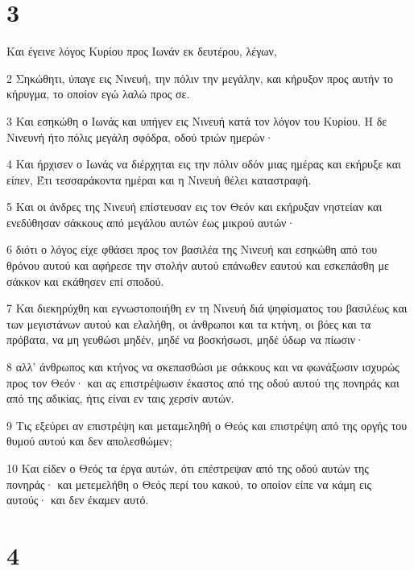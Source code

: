 \chapter{3}

\par Και έγεινε λόγος Κυρίου προς Ιωνάν εκ δευτέρου, λέγων,
\par 2 Σηκώθητι, ύπαγε εις Νινευή, την πόλιν την μεγάλην, και κήρυξον προς αυτήν το κήρυγμα, το οποίον εγώ λαλώ προς σε.
\par 3 Και εσηκώθη ο Ιωνάς και υπήγεν εις Νινευή κατά τον λόγον του Κυρίου. Η δε Νινευνή ήτο πόλις μεγάλη σφόδρα, οδού τριών ημερών·
\par 4 Και ήρχισεν ο Ιωνάς να διέρχηται εις την πόλιν οδόν μιας ημέρας και εκήρυξε και είπεν, Έτι τεσσαράκοντα ημέραι και η Νινευή θέλει καταστραφή.
\par 5 Και οι άνδρες της Νινευή επίστευσαν εις τον Θεόν και εκήρυξαν νηστείαν και ενεδύθησαν σάκκους από μεγάλου αυτών έως μικρού αυτών·
\par 6 διότι ο λόγος είχε φθάσει προς τον βασιλέα της Νινευή και εσηκώθη από του θρόνου αυτού και αφήρεσε την στολήν αυτού επάνωθεν εαυτού και εσκεπάσθη με σάκκον και εκάθησεν επί σποδού.
\par 7 Και διεκηρύχθη και εγνωστοποιήθη εν τη Νινευή διά ψηφίσματος του βασιλέως και των μεγιστάνων αυτού και ελαλήθη, οι άνθρωποι και τα κτήνη, οι βόες και τα πρόβατα, να μη γευθώσι μηδέν, μηδέ να βοσκήσωσι, μηδέ ύδωρ να πίωσιν·
\par 8 αλλ' άνθρωπος και κτήνος να σκεπασθώσι με σάκκους και να φωνάξωσιν ισχυρώς προς τον Θεόν· και ας επιστρέψωσιν έκαστος από της οδού αυτού της πονηράς και από της αδικίας, ήτις είναι εν ταις χερσίν αυτών.
\par 9 Τις εξεύρει αν επιστρέψη και μεταμεληθή ο Θεός και επιστρέψη από της οργής του θυμού αυτού και δεν απολεσθώμεν;
\par 10 Και είδεν ο Θεός τα έργα αυτών, ότι επέστρεψαν από της οδού αυτών της πονηράς· και μετεμελήθη ο Θεός περί του κακού, το οποίον είπε να κάμη εις αυτούς· και δεν έκαμεν αυτό.

\chapter{4}

